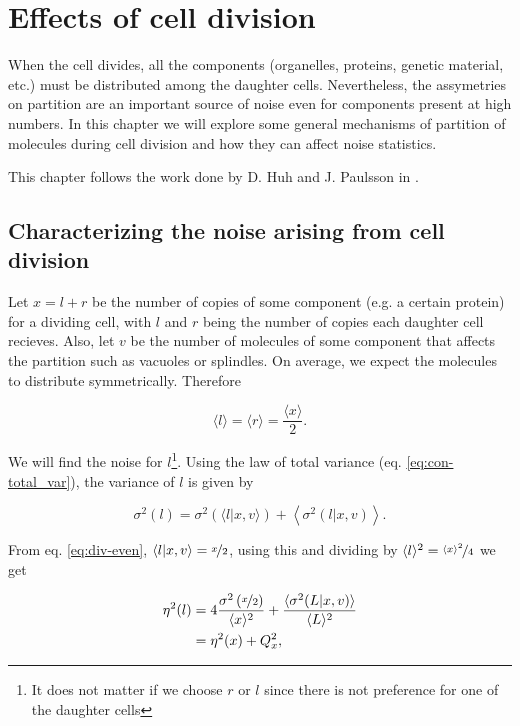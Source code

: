 \chapter{Effects of cell division}
\label{ch:div}

When the cell divides, all the components (organelles, proteins, genetic material, etc.) must be distributed among the daughter cells. Nevertheless, the assymetries on partition are an important source of noise even for components present at high numbers. In this chapter we will explore some general mechanisms of partition of molecules during cell division and how they can affect noise statistics.

This chapter follows the work done by D. Huh and J. Paulsson in \cite{huh11b}.

\section{Characterizing the noise arising from cell division}

Let $x = l+r$ be the number of copies of some component (e.g. a certain protein) for a dividing cell, with $l$ and $r$ being the number of copies each daughter cell recieves. Also, let $v$ be the number of molecules of some component that affects the partition such as vacuoles or splindles. On average, we expect the molecules to distribute symmetrically. Therefore


\begin{equation}
  \label{eq:div-even}
  \langle l\rangle = \langle r\rangle = \frac{\langle x\rangle}{2}.
\end{equation}

We will find the noise for $l$\footnote{It does not matter if we choose $r$ or $l$ since there is not preference for one of the daughter cells}. Using the law of total variance (eq. \eqref{eq:con-total_var}), the variance of $l$ is given by

\begin{equation*}
  \sigma^2(l) = \sigma^2\left(\langle l|x,v\rangle\right) + \left\langle\sigma^2(l|x,v)\right\rangle.
\end{equation*}

From eq. \eqref{eq:div-even}, $\langle l|x,v\rangle = \nicefrac{x}{2}$, using this and dividing by $\langle l\rangle^2 = \nicefrac{\langle x\rangle^2}{4}$ we get

\begin{equation}
  \label{eq:div-noises}
  \begin{split}
    \eta^2(l) &= 4\frac{\sigma^2\left(\nicefrac{x}{2}\right)}{\langle x\rangle^2}+\frac{\langle\sigma^2(L|x,v)\rangle}{\langle L\rangle^2}\\
    &=\eta^2(x) + Q_x^2,
  \end{split}
\end{equation}

